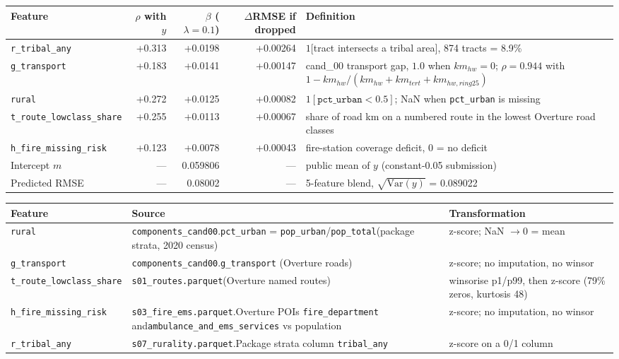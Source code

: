 \begin{tabular}{lrrrp{6.3cm}}
\toprule
Feature & $\rho$ with $y$ & $\beta$ ($\lambda=0.1$) & $\Delta$RMSE if dropped & Definition \\
\midrule
\texttt{r\_tribal\_any} & +0.313 & +0.0198 & +0.00264 & $1[$tract intersects a tribal area$]$, 874 tracts = 8.9\% \\
\texttt{g\_transport} & +0.183 & +0.0141 & +0.00147 & cand\_00 transport gap, $1.0$ when $km_{hw}=0$; $\rho=0.944$ with $1-km_{hw}/(km_{hw}+km_{tert}+km_{hw,ring25})$ \\
\texttt{rural} & +0.272 & +0.0125 & +0.00082 & $1[\texttt{pct\_urban}<0.5]$; NaN when \texttt{pct\_urban} is missing \\
\texttt{t\_route\_lowclass\_share} & +0.255 & +0.0113 & +0.00067 & share of road km on a numbered route in the lowest Overture road classes \\
\texttt{h\_fire\_missing\_risk} & +0.123 & +0.0078 & +0.00043 & fire-station coverage deficit, 0 = no deficit \\
\midrule
Intercept $m$ & --- & 0.059806 & --- & public mean of $y$ (constant-0.05 submission) \\
Predicted RMSE & --- & 0.08002 & --- & 5-feature blend, $\sqrt{\mathrm{Var}(y)}$ = 0.089022 \\
\bottomrule
\end{tabular}

\smallskip

\small
\begin{tabular}{p{5.4cm}p{4.6cm}p{3.9cm}}
\toprule
Feature & Source & Transformation \\
\midrule
\texttt{rural} & \texttt{components\_cand00}.\newline\texttt{pct\_urban} = \texttt{pop\_urban}/\texttt{pop\_total}\newline (package strata, 2020 census) & z-score; NaN $\to 0$ = mean \\
\texttt{g\_transport} & \texttt{components\_cand00}.\newline\texttt{g\_transport} (Overture roads) & z-score; no imputation, no winsor \\
\texttt{t\_route\_lowclass\_share} & \texttt{s01\_routes.parquet}\newline (Overture named routes) & winsorise p1/p99, then z-score (79\% zeros, kurtosis 48) \\
\texttt{h\_fire\_missing\_risk} & \texttt{s03\_fire\_ems.parquet}.\newline Overture POIs \texttt{fire\_department} and\newline \texttt{ambulance\_and\_ems\_services} vs population & z-score; no imputation, no winsor \\
\texttt{r\_tribal\_any} & \texttt{s07\_rurality.parquet}.\newline Package strata column \texttt{tribal\_any} & z-score on a 0/1 column \\
\bottomrule
\end{tabular}

